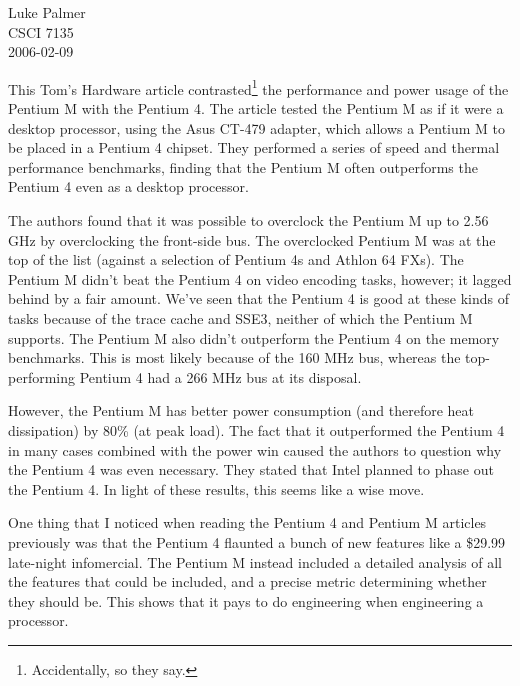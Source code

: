 \documentclass[12pt]{article}
\begin{document}
\noindent
Luke Palmer \\
CSCI 7135 \\
2006-02-09

This Tom's Hardware article contrasted\footnote{Accidentally, so they
say.} the performance and power usage of the Pentium M with the Pentium
4.  The article tested the Pentium M as if it were a desktop processor,
using the Asus CT-479 adapter, which allows a Pentium M to be placed in
a Pentium 4 chipset.  They performed a series of speed and thermal
performance benchmarks, finding that the Pentium M often outperforms the
Pentium 4 even as a desktop processor.

The authors found that it was possible to overclock the Pentium M up to
2.56 GHz by overclocking the front-side bus.  The overclocked Pentium M
was at the top of the list (against a selection of Pentium 4s and Athlon
64 FXs).  The Pentium M didn't beat the Pentium 4 on video encoding
tasks, however; it lagged behind by a fair amount.  We've seen that the
Pentium 4 is good at these kinds of tasks because of the trace cache and
SSE3, neither of which the Pentium M supports. The Pentium M also didn't
outperform the Pentium 4 on the memory benchmarks.  This is most likely
because of the 160 MHz bus, whereas the top-performing Pentium 4 had a
266 MHz bus at its disposal.

However, the Pentium M has better power consumption (and therefore heat
dissipation) by 80\% (at peak load).  The fact that it outperformed the
Pentium 4 in many cases combined with the power win caused the authors
to question why the Pentium 4 was even necessary.  They stated that
Intel planned to phase out the Pentium 4.  In light of these results,
this seems like a wise move.

One thing that I noticed when reading the Pentium 4 and Pentium M
articles previously was that the Pentium 4 flaunted a bunch of new
features like a \$29.99 late-night infomercial.  The Pentium M instead
included a detailed analysis of all the features that could be included,
and a precise metric determining whether they should be.  This shows
that it pays to do engineering when engineering a processor.
\end{document}
